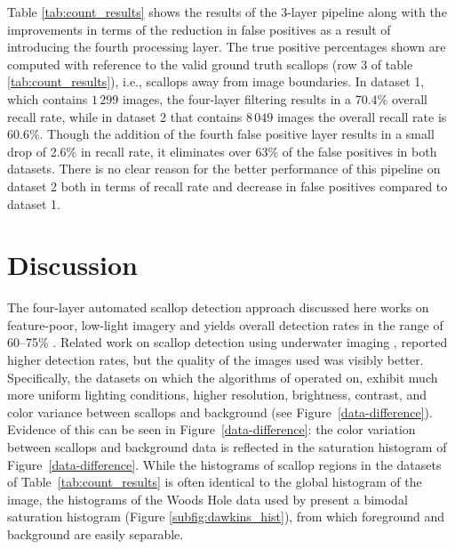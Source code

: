 \documentclass {udthesis}
\begin{document}
Table \ref{tab:count_results} shows the results of the 3-layer pipeline along with the improvements in terms of the reduction in false positives as a result of introducing the fourth processing layer. 
The true positive percentages shown are computed with reference to the valid ground truth scallops (row 3 of table \ref{tab:count_results}), i.e., scallops away from image boundaries.  
In dataset 1, which contains $1\,299$ images, the four-layer filtering results in a 70.4\% overall recall rate, while in dataset 2 that contains $8\,049$ images the overall recall rate is 60.6\%.  Though the addition of the fourth false positive layer results in a small drop of 2.6\% in recall rate, it eliminates over 63\% of the false positives in both datasets.
There is no clear reason for the better performance of this pipeline on dataset 2 both in terms of recall rate and decrease in false positives compared to dataset 1.

\section{Discussion}

The four-layer automated scallop detection approach discussed
here works on feature-poor, low-light imagery and yields
overall detection rates in the range of 60--75\% . 
Related work on scallop detection using underwater imaging \cite{dawkins11,dawkings13},
reported higher detection rates, but the quality of the images used was visibly better.  Specifically,
the datasets on which the 
algorithms of \cite{dawkings13}
operated on, exhibit much more uniform lighting conditions, higher resolution,
brightness, contrast, and color variance between scallops and background 
(see Figure~\ref{data-difference}). 
Evidence of this can be seen in Figure~\ref{data-difference}: the color variation between scallops and background data is reflected in the
saturation histogram of Figure~\ref{data-difference}. While the histograms
of scallop regions in the datasets of Table~\ref{tab:count_results} is often 
identical to the global histogram of the image, the histograms of the Woods Hole data used by \cite{dawkings13} present a bimodal saturation histogram
(Figure \ref{subfig:dawkins_hist}), from which 
foreground and background are easily separable.
\end{document}
